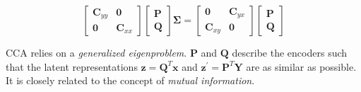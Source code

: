 \documentclass[aspectratio=169, usenames, dvipsnames]{beamer}
\begin{document}
\begin{frame}
  
  \vfill
  
  \begin{tcolorbox}[
    enhanced,
    coltitle=black,
    coltext=white,
    colback=black,
    title=\textbf{Canonical Correlation Analysis},
    frame style tile={width=\paperwidth}{background.jpg}
    ]
    
    \medskip
    
    \Large
    
    \[
      \begin{bmatrix}
        \bm{C}_{yy} & \bm{0} \\
        \bm{0} & \bm{C}_{xx}
      \end{bmatrix}
      \begin{bmatrix}
        \bm{P} \\ \bm{Q}
      \end{bmatrix}
      \boldsymbol{\Sigma}
      =
      \begin{bmatrix}
        \bm{0} & \bm{C}_{yx} \\
        \bm{C}_{xy} & \bm{0}
      \end{bmatrix}
      \begin{bmatrix}
        \bm{P} \\ \bm{Q}
      \end{bmatrix}
    \]
    
    \medskip
  \end{tcolorbox}
  
  \vfill
  
  CCA relies on a \emph{generalized eigenproblem}.
  $\bm{P}$ and $\bm{Q}$ describe the encoders such that the latent representations $\bm{z} = \bm{Q}^T \bm{x}$ and $\bm{z}^{\prime} = \bm{P}^T \bm{Y}$ are as similar as possible.
  It is closely related to the concept of \emph{mutual information}.
  
  \vfill
\end{frame}
\end{document}
